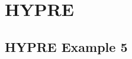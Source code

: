\documentclass[a4paper,10pt]{article}
\begin{document}
\newpage











\newpage










\appendix
\section{\\HYPRE}
\subsection{HYPRE Example 5}
\end{document}
